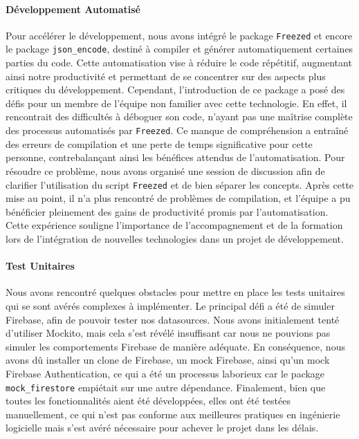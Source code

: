 \paragraph{Développement Automatisé}
Pour accélérer le développement, nous avons intégré le package \texttt{Freezed} et encore le package \texttt{json\_encode}, destiné à compiler et générer automatiquement certaines parties du code. Cette automatisation vise à réduire le code répétitif, augmentant ainsi notre productivité et permettant de se concentrer sur des aspects plus critiques du développement. Cependant, l'introduction de ce package a posé des défis pour un membre de l'équipe non familier avec cette technologie. En effet, il rencontrait des difficultés à déboguer son code, n'ayant pas une maîtrise complète des processus automatisés par \texttt{Freezed}. Ce manque de compréhension a entraîné des erreurs de compilation et une perte de temps significative pour cette personne, contrebalançant ainsi les bénéfices attendus de l'automatisation. Pour résoudre ce problème, nous avons organisé une session de discussion afin de clarifier l'utilisation du script \texttt{Freezed} et de bien séparer les concepts. Après cette mise au point, il n'a plus rencontré de problèmes de compilation, et l'équipe a pu bénéficier pleinement des gains de productivité promis par l'automatisation. Cette expérience souligne l'importance de l'accompagnement et de la formation lors de l'intégration de nouvelles technologies dans un projet de développement.

\paragraph{Test Unitaires}
Nous avons rencontré quelques obstacles pour mettre en place les tests unitaires qui se sont avérés complexes à implémenter. Le principal défi a été de simuler Firebase, afin de pouvoir tester nos datasources. Nous avons initialement tenté d'utiliser Mockito, mais cela s'est révélé insuffisant car nous ne pouvions pas simuler les comportements Firebase de manière adéquate. En conséquence, nous avons dû installer un clone de Firebase, un mock Firebase, ainsi qu'un mock Firebase Authentication, ce qui a été un processus laborieux car le package \texttt{mock\_firestore} empiétait sur une autre dépendance. Finalement, bien que toutes les fonctionnalités aient été développées, elles ont été testées manuellement, ce qui n'est pas conforme aux meilleures pratiques en ingénierie logicielle mais s'est avéré nécessaire pour achever le projet dans les délais.

